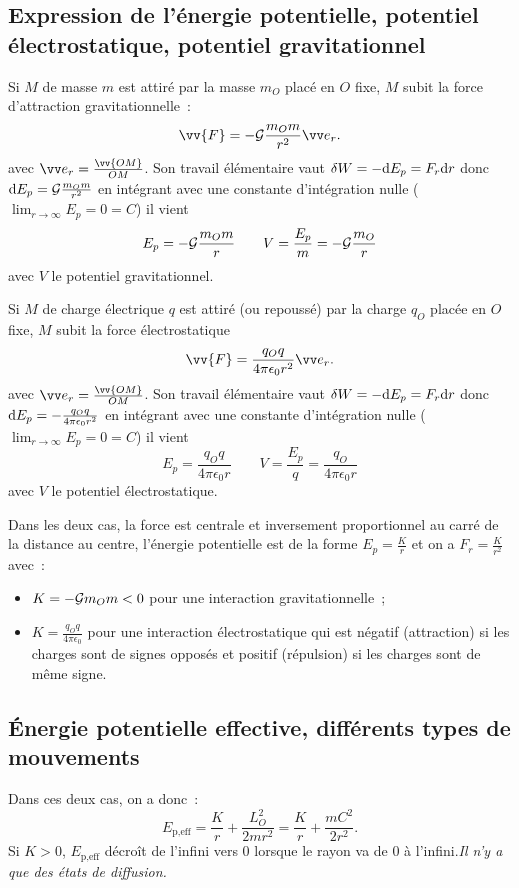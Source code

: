 \subsection{Expression de l'énergie potentielle, potentiel électrostatique,
potentiel gravitationnel}
Si \(M\) de masse \(m\) est attiré par la masse \(m_O\) placé en \(O\) fixe,
\(M\) subit la force d'attraction gravitationnelle~:
\begin{equation}%
  \vv{F} = -\Gb \frac{m_O m}{r^2} \er.
\end{equation}%
avec \(\er = \frac{\vv{OM}}{OM}\). Son travail élémentaire vaut \(\delta W =
-\mathrm{d} E_p = F_r \mathrm{d} r\) donc \(\mathrm{d} E_p = \mathcal{G}\frac{m_O m}{r^2}\) en intégrant avec
une constante d'intégration nulle (\(\lim_{r\to\infty} E_p = 0 = C\)) il vient
\begin{equation}%
  E_p = -\Gb \frac{m_O m}{r} \qquad V = \frac{E_p}{m} = -\Gb \frac{m_O}{r}
\end{equation}%
avec \(V\) le potentiel gravitationnel.

Si \(M\) de charge électrique \(q\) est attiré (ou repoussé) par la charge
\(q_O\) placée en \(O\) fixe, \(M\) subit la force électrostatique
\begin{equation}%
  \vv{F} = \frac{q_O q}{4\pi\epsilon_0r^2} \er.
\end{equation}%
avec \(\er = \frac{\vv{OM}}{OM}\). Son travail élémentaire vaut \(\delta W =
-\mathrm{d} E_p = F_r \mathrm{d} r\) donc \(\mathrm{d} E_p = - \frac{q_O q}{4\pi\epsilon_0r^2}\)
en intégrant avec une constante d'intégration nulle (\(\lim_{r\to\infty}
E_p = 0 = C\)) il vient
\begin{equation}%
  E_p = \frac{q_O q}{4\pi\epsilon_0 r} \qquad V = \frac{E_p}{q} =
  \frac{q_O}{4\pi\epsilon_0 r}
\end{equation}%
avec \(V\) le potentiel électrostatique.

Dans les deux cas, la force est centrale et inversement proportionnel au carré
de la distance au centre, l'énergie potentielle est de la forme \(E_p =
\frac{K}{r}\) et on a \(F_r = \frac{K}{r^2}\) avec~:%
\begin{itemize}%
  \item \(K = -\mathcal{G} m_O m < 0\) pour une interaction gravitationnelle~;
  \item \(K = \frac{q_O q}{4\pi\epsilon_0}\) pour une interaction
    électrostatique qui est négatif (attraction) si les charges sont de signes
    opposés et positif (répulsion) si les charges sont de même signe.
\end{itemize}%
\subsection{Énergie potentielle effective, différents types de mouvements}%
Dans ces deux cas, on a donc~:
\begin{equation}%
  E_{\text{p,eff}} = \frac{K}{r} + \frac{L_O^2}{2mr^2} = \frac{K}{r} +
  \frac{mC^2}{2r^2}.
\end{equation}%
Si \(K >0\), \(E_{\text{p,eff}}\) décroît de l'infini vers 0 lorsque le rayon
va de 0 à l'infini.\emph{Il n'y a que des états de diffusion.}

